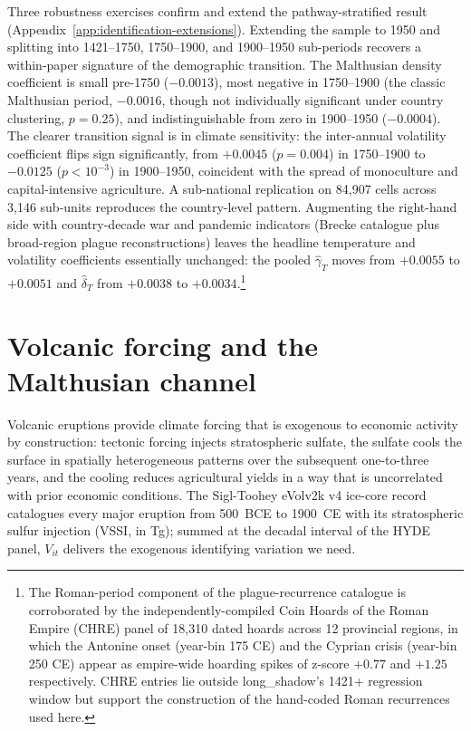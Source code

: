 \documentclass[11pt,letterpaper]{article}
\begin{document}
Three robustness exercises confirm and extend the pathway-stratified result (Appendix~\ref{app:identification-extensions}). Extending the sample to 1950 and splitting into 1421--1750, 1750--1900, and 1900--1950 sub-periods recovers a within-paper signature of the demographic transition. The Malthusian density coefficient is small pre-1750 ($-0.0013$), most negative in 1750--1900 (the classic Malthusian period, $-0.0016$, though not individually significant under country clustering, $p=0.25$), and indistinguishable from zero in 1900--1950 ($-0.0004$). The clearer transition signal is in climate sensitivity: the inter-annual volatility coefficient flips sign significantly, from $+0.0045$ ($p=0.004$) in 1750--1900 to $-0.0125$ ($p<10^{-3}$) in 1900--1950, coincident with the spread of monoculture and capital-intensive agriculture. A sub-national replication on 84{,}907 cells across 3{,}146 sub-units reproduces the country-level pattern. Augmenting the right-hand side with country-decade war and pandemic indicators (Brecke catalogue plus broad-region plague reconstructions) leaves the headline temperature and volatility coefficients essentially unchanged: the pooled $\hat\gamma_T$ moves from $+0.0055$ to $+0.0051$ and $\hat\delta_T$ from $+0.0038$ to $+0.0034$.\footnote{The Roman-period component of the plague-recurrence catalogue is corroborated by the independently-compiled Coin Hoards of the Roman Empire (CHRE) panel of 18{,}310 dated hoards across 12 provincial regions, in which the Antonine onset (year-bin 175 CE) and the Cyprian crisis (year-bin 250 CE) appear as empire-wide hoarding spikes of z-score $+0.77$ and $+1.25$ respectively. CHRE entries lie outside long\_shadow's 1421+ regression window but support the construction of the hand-coded Roman recurrences used here.}

\section{Volcanic forcing and the Malthusian channel}
\label{sec:headline}

Volcanic eruptions provide climate forcing that is exogenous to economic activity by construction: tectonic forcing injects stratospheric sulfate, the sulfate cools the surface in spatially heterogeneous patterns over the subsequent one-to-three years, and the cooling reduces agricultural yields in a way that is uncorrelated with prior economic conditions. The Sigl-Toohey eVolv2k v4 ice-core record \citep{sigl2024evolv2k, toohey2017} catalogues every major eruption from 500~BCE to 1900~CE with its stratospheric sulfur injection (VSSI, in Tg); summed at the decadal interval of the HYDE panel, $V_{it}$ delivers the exogenous identifying variation we need.
\end{document}
